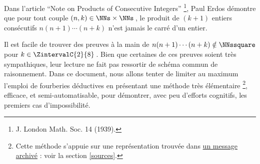 Dans l'article \enquote{Note on Products of Consecutive Integers}
\footnote{
	J. London Math. Soc. 14 (1939).
},
Paul Erdos démontre que pour tout couple $(n, k) \in \NNs \times \NNs$\,, le produit de $(k+1)$ entiers consécutifs $n (n + 1) \cdots (n + k)$ n'est jamais le carré d'un entier. 

\smallskip

Il est facile de trouver des preuves à la main de $n(n+1) \cdots (n + k) \notin \NNssquare$ pour $k \in \ZintervalC{2}{8}$\,.
Bien que certaines de ces preuves soient très sympathiques, leur lecture ne fait pas ressortir de schéma commun de raisonnement.
%
Dans ce document, nous allons tenter de limiter au maximum l'emploi de fourberies déductives en présentant une méthode très élémentaire
\footnote{
	Cette méthode s'appuie sur une représentation trouvée dans \href{https://web.archive.org/web/20171110144534/http://mathforum.org/library/drmath/view/65589.html}{un message archivé} : voir la section \ref{sources}.
},
efficace, et semi-automatisable, pour démontrer, avec peu d'efforts cognitifs, les premiers cas d'impossibilité.

